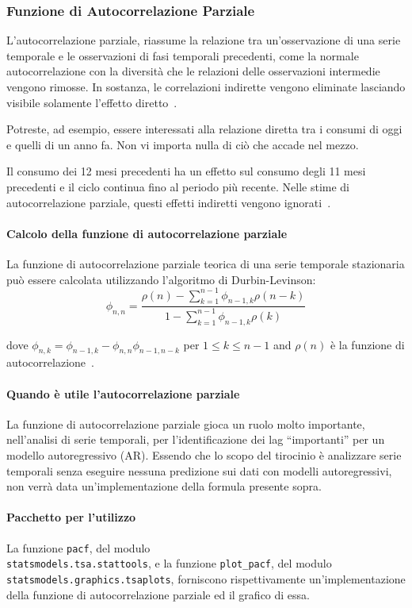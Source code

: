 \subsubsection{Funzione di Autocorrelazione Parziale}
L'autocorrelazione parziale, riassume la relazione tra 
un'osservazione di una serie temporale e le osservazioni di fasi temporali precedenti,
come la normale autocorrelazione con la diversità che le relazioni 
delle osservazioni intermedie vengono rimosse. In sostanza, 
le correlazioni indirette vengono eliminate lasciando visibile solamente
l'effetto diretto~\cite{md:mediumacf_pacf}.

Potreste, ad esempio, essere interessati alla relazione diretta tra i consumi 
di oggi e quelli di un anno fa. Non vi importa nulla di ciò che accade nel mezzo.

Il consumo dei 12 mesi precedenti ha un effetto sul consumo degli 11 mesi precedenti 
e il ciclo continua fino al periodo più recente. Nelle stime di autocorrelazione parziale, 
questi effetti indiretti vengono ignorati~\cite{ain:acf_pacf}.

\paragraph{Calcolo della funzione di autocorrelazione parziale}
La funzione di autocorrelazione parziale teorica di una serie temporale 
stazionaria può essere calcolata utilizzando l'algoritmo di Durbin-Levinson:
\[ \phi_{n,n} = 
\frac
{\rho(n) - \sum_{k = 1}^{n-1}  \phi_{n-1,k}\rho(n-k)}
{1 - \sum_{k = 1}^{n-1} \phi_{n-1,k}\rho(k)} 
\]
    
dove $\phi_{n,k} = \phi_{n-1,k} - \phi_{n,n}\phi_{n-1,n-k}$ per $1 \leq k \leq n-1$ and
$\rho(n)$ è la funzione di autocorrelazione~\cite{wiki:pacf}.

\paragraph{Quando è utile l'autocorrelazione parziale}
\begin{sloppypar}
La funzione di autocorrelazione parziale gioca un ruolo molto importante, nell'analisi
di serie temporali, per l'identificazione dei lag ``importanti'' per un modello autoregressivo
(AR). Essendo che lo scopo del tirocinio è analizzare 
serie temporali senza eseguire nessuna predizione sui dati con modelli autoregressivi, non verrà
data un'implementazione della formula presente sopra.
\end{sloppypar}


\paragraph{Pacchetto per l'utilizzo}
La funzione \texttt{pacf}, del modulo\\ \texttt{statsmodels.tsa.stattools}, e la funzione
\texttt{plot\_pacf}, del modulo\\ \texttt{statsmodels.graphics.tsaplots}, forniscono rispettivamente
un'implementazione della funzione di autocorrelazione parziale ed il grafico di essa.


